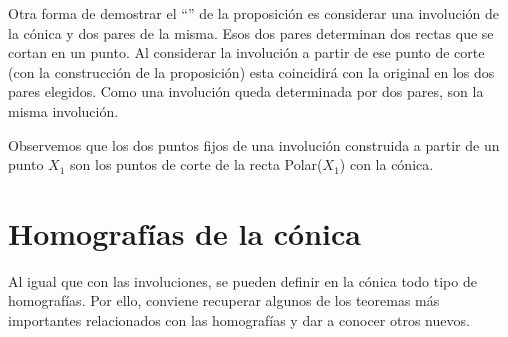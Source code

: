 \begin{obs}
	Otra forma de demostrar el ``'' de la proposición es considerar una involución de la cónica y dos pares de la misma. Esos dos pares determinan dos rectas que se cortan en un punto. Al considerar la involución a partir de ese punto de corte (con la construcción de la proposición) esta coincidirá con la original en los dos pares elegidos. Como una involución queda determinada por dos pares, son la misma involución.
\end{obs}
\begin{obs}
	Observemos que los dos puntos fijos de una involución construida a partir de un punto $X_1$ son los puntos de corte de la recta Polar($X_1$) con la cónica.
\end{obs}

\section{Homografías de la cónica}
Al igual que con las involuciones, se pueden definir en la cónica todo tipo de homografías. Por ello, conviene recuperar algunos de los teoremas más importantes relacionados con las homografías y dar a conocer otros nuevos.

